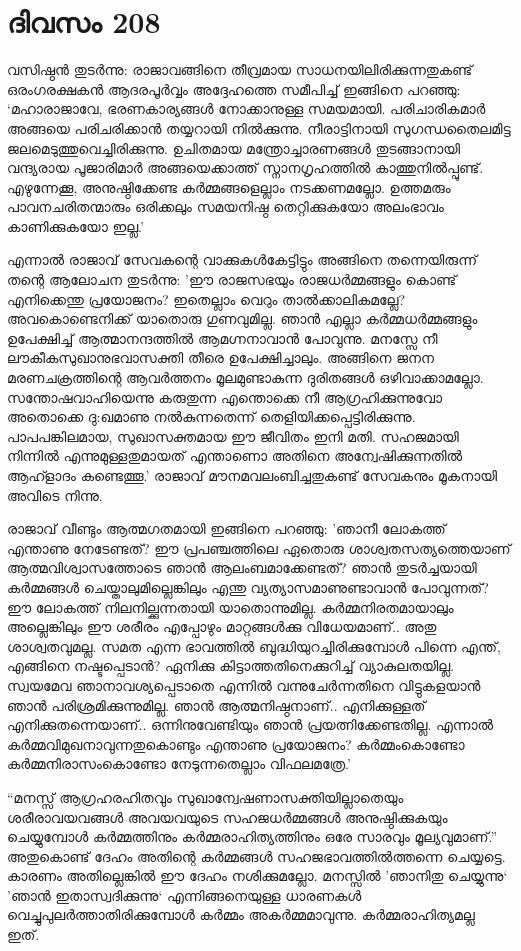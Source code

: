 \section{ദിവസം 208}


വസിഷ്ഠൻ തുടർന്നു: രാജാവങ്ങിനെ തീവ്രമായ സാധനയിലിരിക്കുന്നതുകണ്ട് ഒരംഗരക്ഷകൻ ആദരപൂർവ്വം അദ്ദേഹത്തെ സമീപിച്ച് ഇങ്ങിനെ പറഞ്ഞു: ‘മഹാരാജാവേ, ഭരണകാര്യങ്ങൾ നോക്കാനുള്ള സമയമായി. പരിചാരികമാർ അങ്ങയെ പരിചരിക്കാൻ തയ്യറായി നില്‍ക്കുന്നു. നീരാട്ടിനായി സുഗന്ധതൈലമിട്ട ജലമെടുത്തുവെച്ചിരിക്കുന്നു. ഉചിതമായ മന്ത്രോച്ചാരണങ്ങൾ തുടങ്ങാനായി വന്ദ്യരായ പൂജാരിമാർ അങ്ങയെക്കാത്ത് സ്നാനഗൃഹത്തിൽ കാത്തുനിൽപ്പുണ്ട്. എഴുന്നേക്കൂ, അനുഷ്ഠിക്കേണ്ട കർമ്മങ്ങളെല്ലാം നടക്കണമല്ലോ. ഉത്തമരും പാവനചരിതന്മാരും ഒരിക്കലും സമയനിഷ്ഠ തെറ്റിക്കുകയോ അലംഭാവം കാണിക്കുകയോ ഇല്ല.’

എന്നാൽ രാജാവ് സേവകന്റെ വാക്കുകൾകേട്ടിട്ടും അങ്ങിനെ തന്നെയിരുന്ന് തന്റെ ആലോചന തുടർന്നു: 'ഈ രാജസഭയും രാജധർമ്മങ്ങളും കൊണ്ട് എനിക്കെന്തു പ്രയോജനം? ഇതെല്ലാം വെറും താൽക്കാലികമല്ലേ? അവകൊണ്ടെനിക്ക് യാതൊരു ഗുണവുമില്ല. ഞാൻ എല്ലാ കർമ്മധർമ്മങ്ങളും ഉപേക്ഷിച്ച് ആത്മാനന്ദത്തിൽ ആമഗ്നനാവാൻ പോവുന്നു. മനസ്സേ നീ ലൗകീകസുഖാനുഭവാസക്തി തീരെ ഉപേക്ഷിച്ചാലും. അങ്ങിനെ ജനന മരണചക്രത്തിന്റെ ആവർത്തനം മൂലമുണ്ടാകുന്ന ദുരിതങ്ങൾ ഒഴിവാക്കാമല്ലോ. സന്തോഷവാഹിയെന്നു കരുതുന്ന എന്തൊക്കെ നീ ആഗ്രഹിക്കുന്നുവോ അതൊക്കെ ദു:ഖമാണു നൽകുന്നതെന്ന് തെളിയിക്കപ്പെട്ടിരിക്കുന്നു. പാപപങ്കിലമായ, സുഖാസക്തമായ ഈ ജീവിതം ഇനി മതി. സഹജമായി നിന്നിൽ എന്നുമുള്ളതുമായത്  എന്താണൊ അതിനെ അന്വേഷിക്കുന്നതിൽ ആഹ്ളാദം കണ്ടെത്തൂ.' രാജാവ് മൗനമവലംബിച്ചതുകണ്ട് സേവകനും മൂകനായി അവിടെ നിന്നു.

രാജാവ് വീണ്ടും ആത്മഗതമായി ഇങ്ങിനെ പറഞ്ഞു: 'ഞാനീ ലോകത്ത് എന്താണു നേടേണ്ടത്? ഈ പ്രപഞ്ചത്തിലെ ഏതൊരു ശാശ്വതസത്യത്തെയാണ്‌ ആത്മവിശ്വാസത്തോടെ ഞാൻ ആലംബമാക്കേണ്ടത്? ഞാൻ തുടർച്ചയായി കർമ്മങ്ങൾ ചെയ്താലുമില്ലെങ്കിലും എന്തു വ്യത്യാസമാണുണ്ടാവാൻ പോവുന്നത്? ഈ ലോകത്ത് നിലനില്ക്കുന്നതായി യാതൊന്നുമില്ല. കർമ്മനിരതമായാലും അല്ലെങ്കിലും ഈ ശരീരം എപ്പോഴും മാറ്റങ്ങൾക്കു വിധേയമാണ്‌.. അതു ശാശ്വതവുമല്ല. സമത എന്ന ഭാവത്തിൽ ബുദ്ധിയുറച്ചിരിക്കുമ്പോൾ പിന്നെ എന്ത്, എങ്ങിനെ നഷ്ടപ്പെടാൻ? ഏനിക്കു കിട്ടാത്തതിനെക്കുറിച്ച് വ്യാകുലതയില്ല. സ്വയമേവ ഞാനാവശ്യപ്പെടാതെ എന്നിൽ വന്നുചേർന്നതിനെ വിട്ടുകളയാൻ ഞാൻ പരിശ്രമിക്കുന്നുമില്ല. ഞാൻ ആത്മനിഷ്ഠനാണ്‌.. എനിക്കുള്ളത് എനിക്കുതന്നെയാണ്‌.. ഒന്നിനുവേണ്ടിയും ഞാൻ പ്രയത്നിക്കേണ്ടതില്ല. എന്നാൽ കർമ്മവിമുഖനാവുന്നതുകൊണ്ടും എന്താണു പ്രയോജനം? കർമ്മംകൊണ്ടോ കർമ്മനിരാസംകൊണ്ടോ നേടുന്നതെല്ലാം വിഫലമത്രേ.'

“മനസ്സ്  ആഗ്രഹരഹിതവും സുഖാന്വേഷണാസക്തിയില്ലാതെയും ശരീരാവയവങ്ങൾ അവയവയുടെ സഹജധർമ്മങ്ങൾ അനുഷ്ഠിക്കുകയും ചെയ്യുമ്പോൾ കർമ്മത്തിനും കർമ്മരാഹിത്യത്തിനും ഒരേ സാരവും മൂല്യവുമാണ്‌.” അതുകൊണ്ട് ദേഹം അതിന്റെ കർമ്മങ്ങൾ സഹജഭാവത്തിൽത്തന്നെ ചെയ്യട്ടെ. കാരണം അതില്ലെങ്കിൽ ഈ ദേഹം നശിക്കുമല്ലോ. മനസ്സിൽ ’ഞാനിതു ചെയ്യുന്നു‘ ’ഞാൻ ഇതാസ്വദിക്കുന്നു‘ എന്നിങ്ങനെയുള്ള ധാരണകൾ വെച്ചുപുലർത്താതിരിക്കുമ്പോൾ കർമ്മം അകർമ്മമാവുന്നു. കർമ്മരാഹിത്യമല്ല ഇത്. 

